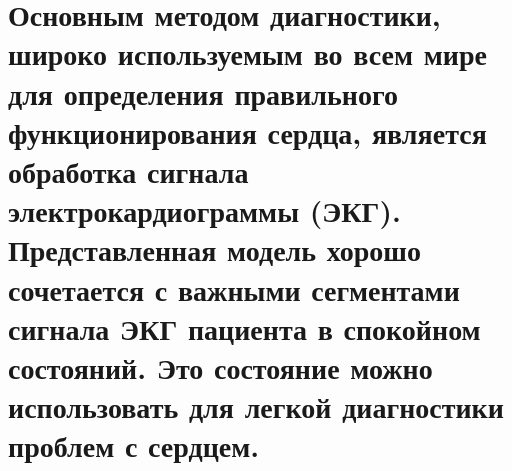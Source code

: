 \documentclass[
]{article}
\begin{document}
\section{Основным методом диагностики, широко используемым во всем мире
для определения правильного функционирования сердца, является обработка
сигнала электрокардиограммы (ЭКГ). Представленная модель хорошо
сочетается с важными сегментами сигнала ЭКГ пациента в спокойном
состояний. Это состояние можно использовать для легкой диагностики
проблем с
сердцем.}\label{ux43eux441ux43dux43eux432ux43dux44bux43c-ux43cux435ux442ux43eux434ux43eux43c-ux434ux438ux430ux433ux43dux43eux441ux442ux438ux43aux438-ux448ux438ux440ux43eux43aux43e-ux438ux441ux43fux43eux43bux44cux437ux443ux435ux43cux44bux43c-ux432ux43e-ux432ux441ux435ux43c-ux43cux438ux440ux435-ux434ux43bux44f-ux43eux43fux440ux435ux434ux435ux43bux435ux43dux438ux44f-ux43fux440ux430ux432ux438ux43bux44cux43dux43eux433ux43e-ux444ux443ux43dux43aux446ux438ux43eux43dux438ux440ux43eux432ux430ux43dux438ux44f-ux441ux435ux440ux434ux446ux430-ux44fux432ux43bux44fux435ux442ux441ux44f-ux43eux431ux440ux430ux431ux43eux442ux43aux430-ux441ux438ux433ux43dux430ux43bux430-ux44dux43bux435ux43aux442ux440ux43eux43aux430ux440ux434ux438ux43eux433ux440ux430ux43cux43cux44b-ux44dux43aux433.-ux43fux440ux435ux434ux441ux442ux430ux432ux43bux435ux43dux43dux430ux44f-ux43cux43eux434ux435ux43bux44c-ux445ux43eux440ux43eux448ux43e-ux441ux43eux447ux435ux442ux430ux435ux442ux441ux44f-ux441-ux432ux430ux436ux43dux44bux43cux438-ux441ux435ux433ux43cux435ux43dux442ux430ux43cux438-ux441ux438ux433ux43dux430ux43bux430-ux44dux43aux433-ux43fux430ux446ux438ux435ux43dux442ux430-ux432-ux441ux43fux43eux43aux43eux439ux43dux43eux43c-ux441ux43eux441ux442ux43eux44fux43dux438ux439.-ux44dux442ux43e-ux441ux43eux441ux442ux43eux44fux43dux438ux435-ux43cux43eux436ux43dux43e-ux438ux441ux43fux43eux43bux44cux437ux43eux432ux430ux442ux44c-ux434ux43bux44f-ux43bux435ux433ux43aux43eux439-ux434ux438ux430ux433ux43dux43eux441ux442ux438ux43aux438-ux43fux440ux43eux431ux43bux435ux43c-ux441-ux441ux435ux440ux434ux446ux435ux43c.}
\end{document}
